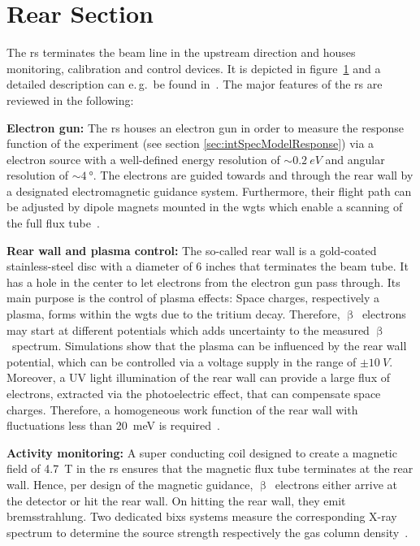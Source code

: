 \section{Rear Section}
\label{sec:katrinExpSetupRearSection}
\begin{figure}[t]
 \label{fig:rearSection}
\end{figure}

The \gls{rs} terminates the beam line in the upstream direction and houses monitoring, calibration and control devices. It is depicted in figure~\ref{fig:rearSection} and a detailed description can e.\,g.~be found in~\cite{Babutzka2014}. The major features of the \gls{rs} are reviewed in the following:

{\par\textbf{Electron gun:}
The \gls{rs} houses an electron gun in order to measure the response function of the experiment (see section \ref{sec:intSpecModelResponse}) via a electron source with a well-defined energy resolution of $\sim \SI{0.2}{eV}$ and angular resolution of $\sim \SI{4}{\degree}$. The electrons are guided towards and through the rear wall by a designated electromagnetic guidance system. Furthermore, their flight path can be adjusted by dipole magnets mounted in the \gls{wgts} which enable a scanning of the full flux tube~\cite{Babutzka2014}.}

{\par \textbf{Rear wall and plasma control:}
The so-called rear wall is a gold-coated stainless-steel disc with a diameter of 6 inches that terminates the beam tube. It has a hole in the center to let electrons from the electron gun pass through. Its main purpose is the control of plasma effects: Space charges, respectively a plasma, forms within the \gls{wgts} due to the tritium decay. Therefore, $\upbeta$~electrons may start at different potentials which adds uncertainty to the measured $\upbeta$~spectrum. Simulations show that the plasma can be influenced by the rear wall potential, which can be controlled via a voltage supply in the range of $\pm \SI{10}{V}$. Moreover, a UV light illumination of the rear wall can provide a large flux of electrons, extracted via the photoelectric effect, that can compensate space charges. Therefore, a homogeneous work function of the rear wall with fluctuations less than \SI{20}{meV} is required~\cite{Kuckert2018, Kuckert2016}.}

{\par\textbf{Activity monitoring:}
A super conducting coil designed to create a magnetic field of \SI{4.7}{T} in the \gls{rs} ensures that the magnetic flux tube terminates at the rear wall. Hence, per design of the magnetic guidance, $\upbeta$~electrons either arrive at the detector or hit the rear wall. On hitting the rear wall, they emit bremsstrahlung. Two dedicated \gls{bixs} systems measure the corresponding X-ray spectrum to determine the source strength respectively the gas column density~\cite{Roellig2015}.}
